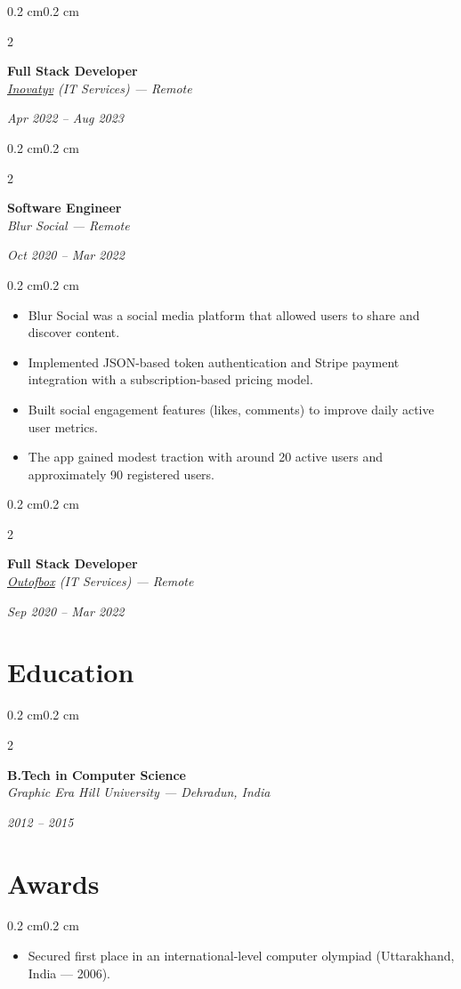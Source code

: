 \documentclass[10pt, letterpaper]{article}
\newenvironment{highlights}{
    \begin{itemize}[
        topsep=0.10 cm,
        parsep=0.10 cm,
        partopsep=0pt,
        itemsep=0pt,
        leftmargin=0.5 cm
    ]
}{
    \end{itemize}
}
\newenvironment{onecolentry}{
    \begin{adjustwidth}{0.2 cm}{0.2 cm}
}{
    \end{adjustwidth}
}
\newenvironment{twocolentry}[2][]{
    \onecolentry
    \def\secondColumn{#2}
    \setcolumnwidth{\fill, 4.5 cm}
    \begin{paracol}{2}
}{
    \switchcolumn \raggedleft \secondColumn
    \end{paracol}
    \endonecolentry
}
\begin{document}
\vspace{0.2cm}

\begin{twocolentry}{\textit{Apr 2022 -- Aug 2023}}
    \textbf{Full Stack Developer} \\
    \textit{\href{https://www.inovatyv.com/}{Inovatyv} (IT Services) — Remote}
\end{twocolentry}


\vspace{0.2cm}

\begin{twocolentry}{\textit{Oct 2020 -- Mar 2022}}
    \textbf{Software Engineer} \\
    \textit{Blur Social — Remote}
\end{twocolentry}
\begin{onecolentry}
\begin{highlights}
    \item Blur Social was a social media platform that allowed users to share and discover content.
    \item Implemented JSON-based token authentication and Stripe payment integration with a subscription-based pricing model.
    \item Built social engagement features (likes, comments) to improve daily active user metrics.
    \item The app gained modest traction with around 20 active users and approximately 90 registered users.
\end{highlights}
\end{onecolentry}

\vspace{0.2cm}

\begin{twocolentry}{\textit{Sep 2020 -- Mar 2022}}
    \textbf{Full Stack Developer} \\
    \textit{\href{https://outofbox.co}{Outofbox} (IT Services) — Remote}
\end{twocolentry}

\section{Education}
\begin{twocolentry}{\textit{2012 -- 2015}}
    \textbf{B.Tech in Computer Science} \\
    \textit{Graphic Era Hill University — Dehradun, India}
\end{twocolentry}

\section{Awards}
\begin{onecolentry}
\begin{highlights}
    \item Secured first place in an international-level computer olympiad (Uttarakhand, India — 2006).
\end{highlights}
\end{onecolentry}
\end{document}
